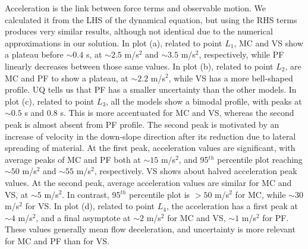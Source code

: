 \documentclass{article}
\begin{document}
Acceleration is the link between force terms and observable motion. We calculated it from the LHS of the dynamical equation, but using the RHS terms produces very similar results, although not identical due to the numerical approximations in our solution. In plot (a), related to point $L_1$, MC and VS show a plateau before $\sim 0.4$ s, at $\sim 2.5$ m/s$^2$ and $\sim 3.5$ m/s$^2$, respectively, while PF linearly decreases between those same values. In plot (b), related to point $L_2$, are MC and PF to show a plateau, at $\sim 2.2$ m/s$^2$, while VS has a more bell-shaped profile. UQ tells us that PF has a smaller uncertainty than the other models. In plot (c), related to point $L_3$, all the models show a bimodal profile, with peaks at $\sim 0.5$ s and $0.8$ s. This is more accentuated for MC and VS, whereas the second peak is almost absent from PF profile. The second peak is motivated by an increase of velocity in the down-slope direction after its reduction due to lateral spreading of material. At the first peak, acceleration values are significant, with average peaks of MC and PF both at $\sim 15$ m/s$^2$, and 95$^{th}$ percentile plot reaching $\sim 50$ m/s$^2$ and $\sim 55$ m/s$^2$, respectively. VS shows about halved acceleration peak values. At the second peak, average acceleration values are similar for MC and VS, at $\sim 5$ m/s$^2$. In contrast, 95$^{th}$ percentile plot is $> 50$ m/s$^2$ for MC, while $\sim 30$ m/s$^2$ for VS. In plot (d), related to point $L_4$, the acceleration has a first peak at $\sim 4$ m/s$^2$, and a final asymptote at $\sim 2$ m/s$^2$ for MC and VS, $\sim 1$ m/s$^2$ for PF. These values generally mean flow deceleration, and uncertainty is more relevant for MC and PF than for VS.
\end{document}
